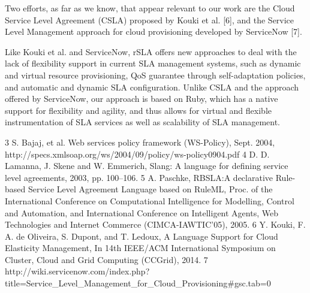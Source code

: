  Two efforts, as far as we know, that appear relevant to our work are the Cloud Service Level Agreement (CSLA) proposed by Kouki et al. [6], and the Service Level Management approach for cloud provisioning developed by ServiceNow [7]. 
 
 Like Kouki et al. and ServiceNow, rSLA offers new approaches to deal with the lack of flexibility support in current SLA management systems, such as dynamic and virtual resource provisioning, QoS guarantee through self-adaptation policies, and automatic and dynamic SLA configuration. Unlike CSLA and the approach offered by ServiceNow, our approach is based on Ruby, which has a native support for flexibility and agility, and thus allows for virtual and flexible instrumentation of SLA services as well as scalability of SLA management.



3	S. Bajaj, et al. Web services policy framework (WS-Policy), Sept. 2004, http://specs.xmlsoap.org/ws/2004/09/policy/ws-policy0904.pdf
4	D. D. Lamanna, J. Skene and W. Emmerich, Slang: A language for defining service level agreements, 2003, pp. 100–106.
5	A. Paschke, RBSLA:A declarative Rule-based Service Level Agreement Language based on RuleML, Proc. of the International Conference on Computational Intelligence for Modelling, Control and Automation, and International Conference on Intelligent Agents, Web Technologies and Internet Commerce (CIMCA-IAWTIC’05), 2005.
6	Y. Kouki, F. A. de Oliveira, S. Dupont, and T. Ledoux, A Language Support for Cloud Elasticity Management, In 14th IEEE/ACM International Symposium on Cluster, Cloud and Grid Computing (CCGrid), 2014.
7	http://wiki.servicenow.com/index.php?title=Service_Level_Management_for_Cloud_Provisioning#gsc.tab=0 
